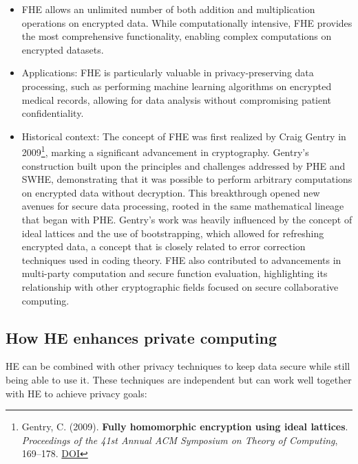 \documentclass[
  letterpaper,
  DIV=11,
  numbers=noendperiod,
  oneside]{scrartcl}
\begin{document}
\begin{enumerate}
  \begin{itemize}
  \item
    FHE allows an unlimited number of both addition and multiplication
    operations on encrypted data. While computationally intensive, FHE
    provides the most comprehensive functionality, enabling complex
    computations on encrypted datasets.
  \item
    Applications: FHE is particularly valuable in privacy-preserving
    data processing, such as performing machine learning algorithms on
    encrypted medical records, allowing for data analysis without
    compromising patient confidentiality.
  \item
    Historical context: The concept of FHE was first realized by Craig
    Gentry in 2009\footnote{Gentry, C. (2009). \textbf{Fully homomorphic
      encryption using ideal lattices}. \emph{Proceedings of the 41st
      Annual ACM Symposium on Theory of Computing}, 169--178.
      \href{https://doi.org/10.1145/1536414.1536440}{DOI}}, marking a
    significant advancement in cryptography. Gentry's construction built
    upon the principles and challenges addressed by PHE and SWHE,
    demonstrating that it was possible to perform arbitrary computations
    on encrypted data without decryption. This breakthrough opened new
    avenues for secure data processing, rooted in the same mathematical
    lineage that began with PHE. Gentry's work was heavily influenced by
    the concept of ideal lattices and the use of bootstrapping, which
    allowed for refreshing encrypted data, a concept that is closely
    related to error correction techniques used in coding theory. FHE
    also contributed to advancements in multi-party computation and
    secure function evaluation, highlighting its relationship with other
    cryptographic fields focused on secure collaborative computing.
  \end{itemize}
\end{enumerate}

\subsection{How HE enhances private
computing}\label{how-he-enhances-private-computing}

HE can be combined with other privacy techniques to keep data secure
while still being able to use it. These techniques are independent but
can work well together with HE to achieve privacy goals:
\end{document}

